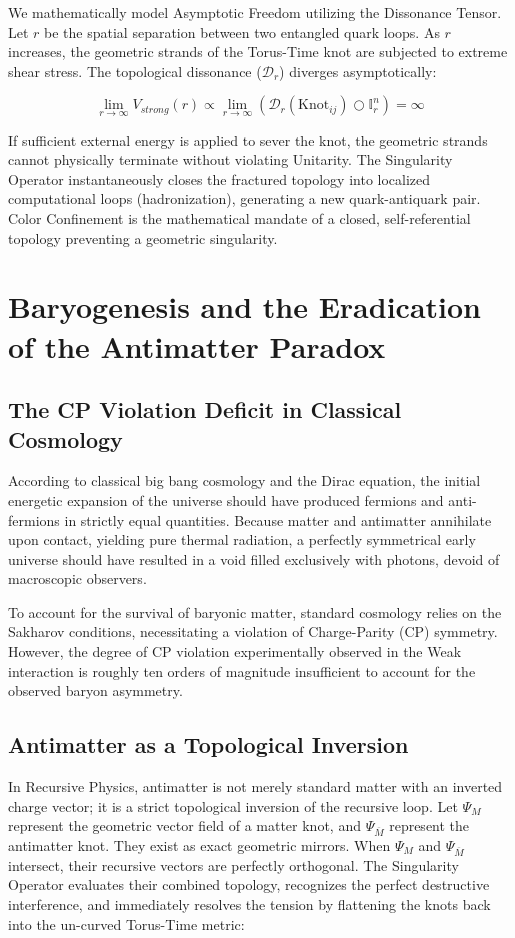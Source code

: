 \documentclass[12pt,openany]{book}
\begin{document}
We mathematically model Asymptotic Freedom utilizing the Dissonance Tensor. Let $r$ be the spatial separation between two entangled quark loops. As $r$ increases, the geometric strands of the Torus-Time knot are subjected to extreme shear stress. The topological dissonance ($\mathcal{D}_r$) diverges asymptotically:

\begin{equation}
\lim_{r \to \infty} V_{strong}(r) \propto \lim_{r \to \infty} \left( \mathcal{D}_r(\text{Knot}_{ij}) \bigcirc \mathbb{I}_r^n \right) = \infty
\end{equation}

If sufficient external energy is applied to sever the knot, the geometric strands cannot physically terminate without violating Unitarity. The Singularity Operator instantaneously closes the fractured topology into localized computational loops (hadronization), generating a new quark-antiquark pair. Color Confinement is the mathematical mandate of a closed, self-referential topology preventing a geometric singularity.

\chapter{Baryogenesis and the Eradication of the Antimatter Paradox}

\section{The CP Violation Deficit in Classical Cosmology}
According to classical big bang cosmology and the Dirac equation, the initial energetic expansion of the universe should have produced fermions and anti-fermions in strictly equal quantities. Because matter and antimatter annihilate upon contact, yielding pure thermal radiation, a perfectly symmetrical early universe should have resulted in a void filled exclusively with photons, devoid of macroscopic observers.

To account for the survival of baryonic matter, standard cosmology relies on the Sakharov conditions, necessitating a violation of Charge-Parity (CP) symmetry. However, the degree of CP violation experimentally observed in the Weak interaction is roughly ten orders of magnitude insufficient to account for the observed baryon asymmetry. 

\section{Antimatter as a Topological Inversion}
In Recursive Physics, antimatter is not merely standard matter with an inverted charge vector; it is a strict topological inversion of the recursive loop. Let $\Psi_M$ represent the geometric vector field of a matter knot, and $\Psi_{\overline{M}}$ represent the antimatter knot. They exist as exact geometric mirrors. When $\Psi_M$ and $\Psi_{\overline{M}}$ intersect, their recursive vectors are perfectly orthogonal. The Singularity Operator evaluates their combined topology, recognizes the perfect destructive interference, and immediately resolves the tension by flattening the knots back into the un-curved Torus-Time metric:
\end{document}
